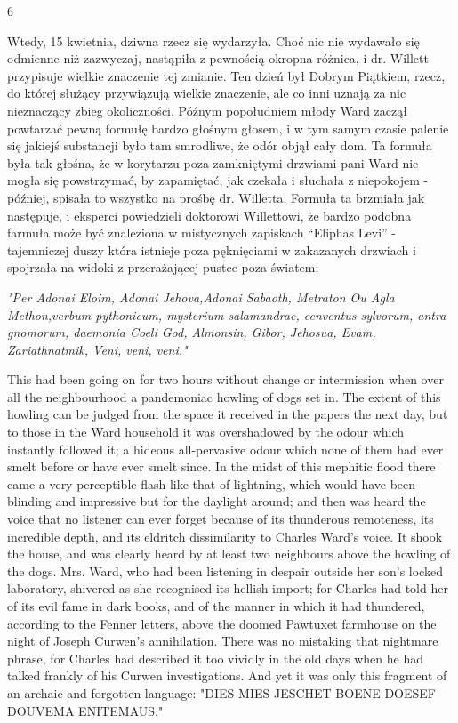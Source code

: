 \begin{center}
6
\end{center}

Wtedy, 15 kwietnia, dziwna rzecz się wydarzyła. Choć nic nie wydawało się odmienne niż zazwyczaj, nastąpiła z pewnością okropna różnica, i dr. Willett przypisuje wielkie znaczenie tej zmianie. Ten dzień był Dobrym Piątkiem, rzecz, do której służący przywiązują wielkie znaczenie, ale co inni uznają za nic nieznaczący zbieg okoliczności. Późnym popołudniem młody Ward zaczął powtarzać pewną formułę bardzo głośnym głosem, i w tym samym czasie palenie się jakiejś substancji było tam smrodliwe, że odór objął cały dom. Ta formuła była tak głośna, że w korytarzu poza zamkniętymi drzwiami pani Ward nie mogła się powstrzymać, by zapamiętać, jak czekała i słuchała z niepokojem - później, spisała to wszystko na prośbę dr. Willetta. Formuła ta brzmiała jak następuje, i eksperci powiedzieli doktorowi Willettowi, że bardzo podobna farmuła może być znaleziona w mistycznych zapiskach ``Eliphas Levi'' - tajemniczej duszy która istnieje poza pęknięciami w zakazanych drzwiach i spojrzała na widoki z przerażającej pustce poza światem:

\begin{displayquote}
\textit{"Per Adonai Eloim, Adonai Jehova,\break Adonai Sabaoth, Metraton Ou Agla Methon,\break verbum pythonicum, mysterium salamandrae, \break cenventus sylvorum, antra gnomorum, \break daemonia Coeli God, Almonsin, Gibor, \break Jehosua, Evam, Zariathnatmik, Veni, veni, veni."}
\end{displayquote}

This had been going on for two hours without change or intermission when over all the neighbourhood a pandemoniac howling of dogs set in. The extent of this howling can be judged from the space it received in the papers the next day, but to those in the Ward household it was overshadowed by the odour which instantly followed it; a hideous all-pervasive odour which none of them had ever smelt before or have ever smelt since. In the midst of this mephitic flood there came a very perceptible flash like that of lightning, which would have been blinding and impressive but for the daylight around; and then was heard the voice that no listener can ever forget because of its thunderous remoteness, its incredible depth, and its eldritch dissimilarity to Charles Ward's voice. It shook the house, and was clearly heard by at least two neighbours above the howling of the dogs. Mrs. Ward, who had been listening in despair outside her son's locked laboratory, shivered as she recognised its hellish import; for Charles had told her of its evil fame in dark books, and of the manner in which it had thundered, according to the Fenner letters, above the doomed Pawtuxet farmhouse on the night of Joseph Curwen's annihilation. There was no mistaking that nightmare phrase, for Charles had described it too vividly in the old days when he had talked frankly of his Curwen investigations. And yet it was only this fragment of an archaic and forgotten language: "DIES MIES JESCHET BOENE DOESEF DOUVEMA ENITEMAUS."

